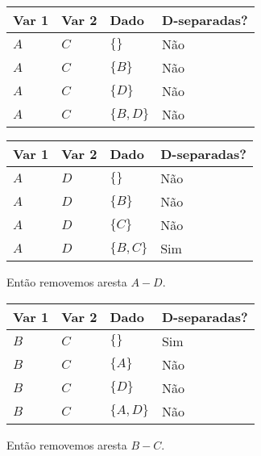 \documentclass[paper=a4, fontsize=11pt]{scrartcl} %
\numberwithin{equation}{subsection}
\numberwithin{figure}{subsection}
\numberwithin{table}{subsection}
\numberwithin{definition}{subsection}
\numberwithin{theorem}{subsection}
\numberwithin{property}{subsection}
\numberwithin{proposition}{subsection}
\numberwithin{equation}{section}
\numberwithin{figure}{section}
\numberwithin{table}{section}
\numberwithin{definition}{section}
\numberwithin{theorem}{section}
\numberwithin{property}{section}
\numberwithin{proposition}{section}
\begin{document}
\begin{table}[H]
  \centering
    \begin{tabular}{|l|l|l|l|}
        \hline
        Var 1 & Var 2 & Dado          & D-separadas? \\ \hline
        $A$   & $C$   & $\{ \} $      & Não          \\ 
        $A$   & $C$   & $\{ B \}$     & Não          \\ 
        $A$   & $C$   & $\{ D \}$     & Não          \\ 
        $A$   & $C$   & $\{ B, D \} $ & Não          \\
        \hline
    \end{tabular}
\end{table}




\begin{table}[H]
  \centering
    \begin{tabular}{|l|l|l|l|}
        \hline
        Var 1 & Var 2 & Dado          & D-separadas? \\ \hline
        $A$   & $D$   & $\{ \} $      & Não            \\ 
        $A$   & $D$   & $\{ B \}$     & Não          \\ 
        $A$   & $D$   & $\{ C \}$     & Não          \\ 
        $A$   & $D$   & $\{ B, C \} $ & Sim       \\
        \hline
    \end{tabular}
\end{table}

Então removemos aresta $A-D$.



\begin{table}[H]
  \centering
    \begin{tabular}{|l|l|l|l|}
        \hline
        Var 1 & Var 2 & Dado          & D-separadas? \\ \hline
        $B$   & $C$   & $\{ \} $      & Sim       \\ 
        $B$   & $C$   & $\{ A \}$     & Não      \\ 
        $B$   & $C$   & $\{ D \}$     & Não          \\ 
        $B$   & $C$   & $\{ A, D \} $ & Não     \\
        \hline
    \end{tabular}
\end{table}

Então removemos aresta $B-C$.
\end{document}

